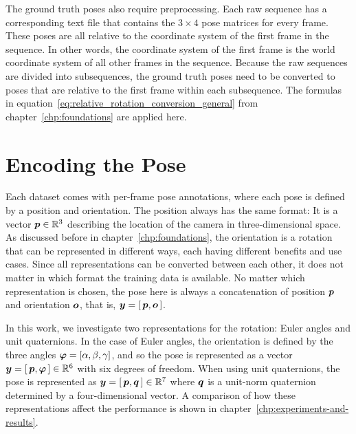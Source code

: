 			The ground truth poses also require preprocessing. 
			Each raw sequence has a corresponding text file that contains the $3 \times 4$ pose matrices for every frame.
			These poses are all relative to the coordinate system of the first frame in the sequence.
			In other words, the coordinate system of the first frame is the world coordinate system of all other frames in the sequence.
			Because the raw sequences are divided into subsequences, the ground truth poses need to be converted to poses that are relative to the first frame within each subsequence.
			The formulas in equation~\ref{eq:relative_rotation_conversion_general} from chapter~\ref{chp:foundations} are applied here.
			
			
	\section{Encoding the Pose}
		Each dataset comes with per-frame pose annotations, where each pose is defined by a position and orientation.
		The position always has the same format: It is a vector $\bm{p} \in \mathbb{R}^3$ describing the location of the camera in three-dimensional space.
		As discussed before in chapter~\ref{chp:foundations}, the orientation is a rotation that can be represented in different ways, each having different benefits and use cases.
		Since all representations can be converted between each other, it does not matter in which format the training data is available.
		No matter which representation is chosen, the pose here is always a concatenation of position $\bm{p}$ and orientation $\bm{o}$, that is, 
		$\bm{y} = \left[ \, \bm{p},  \bm{o} \, \right]$.
		
		In this work, we investigate two representations for the rotation: Euler angles and unit quaternions.
		In the case of Euler angles, the orientation is defined by the three angles 
		$\bm{\varphi} = \left[\alpha, \beta, \gamma\right]$, 
		and so the pose is represented as a vector
		$\bm{y} = \left[ \, \bm{p},  \bm{\varphi} \, \right] \in \mathbb{R}^6$ 
		with six degrees of freedom.
		When using unit quaternions, the pose is represented as 
		$\bm{y} = \left[ \, \bm{p},  \bm{q} \, \right] \in \mathbb{R}^7$ 
		where $\bm{q}$ is a unit-norm quaternion determined by a four-dimensional vector.
		A comparison of how these representations affect the performance is shown in chapter~\ref{chp:experiments-and-results}.
		
